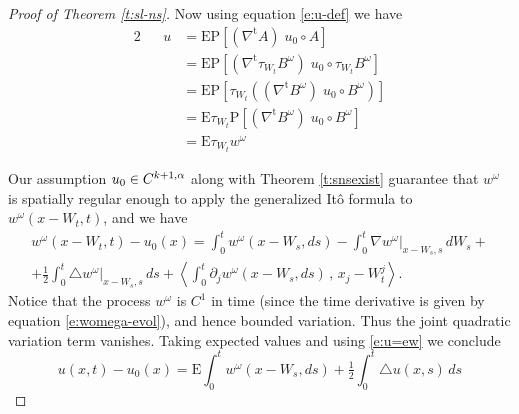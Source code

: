 \documentclass[final]{amsart}%
\newcommand{\del}{\partial}
\newcommand{\lap}{\triangle}
\newcommand{\transpose}{^\text{t}}
\newcommand{\grad}{\nabla}
\newcommand{\gradt}{\grad\transpose}
\newcommand{\womega}{{w^\omega}}
\newcommand{\E}{\boldsymbol{\mathrm{E}}}
\newcommand{\lhp}{\boldsymbol{\mathrm{P}}}
\newcommand{\at}[1]{\big|_{#1}}
\newcommand{\holderspace}[2]{\ensuremath{C^{\ifx0#1{#2}\else{#1,#2}\fi}}}
\newif\iftextstyle
\newcommand{\qv}[2]{\iftextstyle\langle#1,#2\rangle\else\left\langle#1\,,\,#2\right\rangle\fi}
\numberwithin{equation}{section}
\theoremstyle{definition}
\theoremstyle{remark}
\begin{document}
\begin{proof}[Proof of Theorem \ref{t:sl-ns}]
Now using equation \eqref{e:u-def} we have
\begin{alignat}{2}
\nonumber &&	u &= \E \lhp \left[ (\gradt A) \; u_0 \circ A \right]\\
\nonumber &&	&= \E \lhp \left[ (\gradt \tau_{W_t} B^\omega) \; u_0 \circ \tau_{W_t} B^\omega \right]\\
\nonumber &&	&= \E \lhp \left[ \tau_{W_t} \left( (\gradt B^\omega) \; u_0 \circ B^\omega \right)\right]\\
\nonumber &&	&= \E \tau_{W_t} \lhp \left[ (\gradt B^\omega) \; u_0 \circ B^\omega \right]\\
\label{e:u=ew} &&	&= \E \tau_{W_t} \womega
\end{alignat}

Our assumption $u_0 \in \holderspace{k+1}{\alpha}$ along with Theorem \ref{t:snsexist} guarantee that $\womega$ is spatially regular enough to apply the generalized It\^o formula \cite{kunita} to $\womega( x - W_t, t)$, and we have
\begin{multline*}
\womega( x - W_t, t) - u_0(x) = \int_0^t \womega( x - W_s, ds) - \int_0^t \grad \womega \at{x-W_s, s} \, dW_s + \\
    + \tfrac{1}{2} \int_0^t \lap \womega\at{x-W_s, s} \,ds + \qv{\int_0^t \del_j \womega( x - W_s, ds)}{x_j - W^j_t}.
\end{multline*}
Notice that the process $\womega$ is $C^1$ in time (since the time derivative is given by equation \eqref{e:womega-evol}), and hence bounded variation. Thus the joint quadratic variation term vanishes. Taking expected values and using \eqref{e:u=ew} we conclude
\begin{equation}
\label{e:u1} u(x,t) - u_0(x) = \E \int_0^t \womega( x - W_s, ds) + \tfrac{1}{2} \int_0^t \lap u(x,s) \,ds
\end{equation}


\end{proof}
\end{document}
